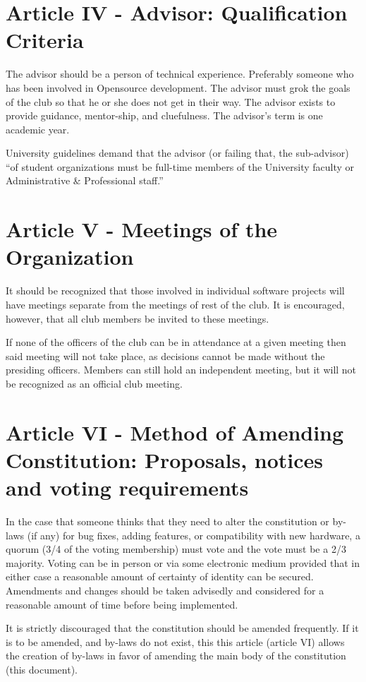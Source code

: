 \documentclass{article}
\begin{document}
	\section{Article IV - Advisor: Qualification Criteria}

	The advisor should be a person of technical experience. Preferably someone who has been involved in Opensource development. The advisor must grok the goals of the club so that he or she does not get in their way. The advisor exists to provide guidance, mentor-ship, and cluefulness. The advisor's term is one academic year.

	University guidelines demand that the advisor (or failing that, the sub-advisor) ``of student organizations must be full-time members of the University faculty or Administrative \& Professional staff.''

	\section{Article V - Meetings of the Organization}

	It should be recognized that those involved in individual software projects will have meetings separate from the meetings of rest of the club. It is encouraged, however, that all club members be invited to these meetings.

	If none of the officers of the club can be in attendance at a given meeting then said meeting will not take place, as decisions cannot be made without the presiding officers. Members can still hold an independent meeting, but it will not be recognized as an official club meeting.

	\section{Article VI - Method of Amending Constitution: Proposals, notices and voting requirements}

	In the case that someone thinks that they need to alter the constitution or by-laws (if any) for bug fixes, adding features, or compatibility with new hardware, a quorum (3/4 of the voting membership) must vote and the vote must be a 2/3 majority. Voting can be in person or via some electronic medium provided that in either case a reasonable amount of certainty of identity can be secured. Amendments and changes should be taken advisedly and considered for a reasonable amount of time before being implemented.

	It is strictly discouraged that the constitution should be amended frequently. If it is to be amended, and by-laws do not exist, this this article (article VI) allows the creation of by-laws in favor of amending the main body of the constitution (this document).
\end{document}
